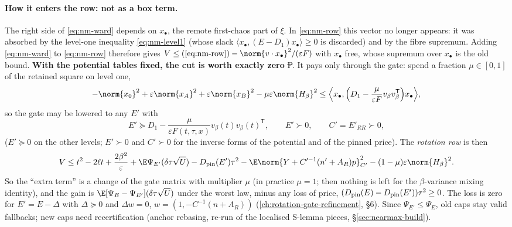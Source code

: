 \paragraph{How it enters the row: not as a box term.} The right side of \eqref{eq:nm-ward} depends on $x_\bullet$, the remote first-chaos part of $\xi$. In \eqref{eq:nm-row} this
vector no longer appears: it was absorbed by the level-one inequality \eqref{eq:nm-level1} (whose slack $\langle x_\bullet,(E-D_1)x_\bullet\rangle\ge0$ is discarded) and by the fibre
supremum. Adding \eqref{eq:nm-ward} to \eqref{eq:nm-row} therefore gives $V\le(\ref{eq:nm-row})-\norm{v\cdot x_\bullet}^2/(\varepsilon F)$ with $x_\bullet$ free, whose supremum over
$x_\bullet$ is the old bound. \textbf{With the potential tables fixed, the cut is worth exactly zero} \st{P}. It pays only through the gate: spend a fraction $\mu\in[0,1]$ of the retained
square on level one,
\[
-\norm{x_0}^2+\varepsilon\norm{x_A}^2+\varepsilon\norm{x_B}^2-\mu\varepsilon\norm{H_\beta}^2\le\Bigl\langle x_\bullet,\Bigl(D_1-\frac{\mu}{\varepsilon F}v_\beta v_\beta^{\mathsf T}\Bigr)x_\bullet\Bigr\rangle ,
\]
so the gate may be lowered to any $E'$ with
\begin{equation}\label{eq:nm-gate}
E'\succeq D_1-\frac{\mu}{\varepsilon F(t,\tau,x)}v_\beta(t)v_\beta(t)^{\mathsf T},\qquad E'\succ0,\qquad C'=E'_{RR}\succ0 ,
\end{equation}
($E'\succeq0$ on the other levels; $E'\succ0$ and $C'\succ0$ for the inverse forms of the potential and of the pinned price). The \emph{rotation row} is then
\begin{equation}\label{eq:nm-rotrow}
V\le t^2-2\ell t+\frac{2\beta^2}\varepsilon+\E\Psi_{E'}(\delta\tau\sqrt U)-D_{\rm pin}(E')\tau^2-\E\norm{Y+C'^{-1}(n'+A_R)p}^2_{C'}-(1-\mu)\varepsilon\norm{H_\beta}^2 .
\end{equation}
So the ``extra term'' is a change of the gate matrix with multiplier $\mu$ (in practice $\mu=1$; then nothing is left for the $\beta$-variance mixing identity), and the gain is
$\E[\Psi_E-\Psi_{E'}](\delta\tau\sqrt U)$ under the worst law, minus any loss of price, $(D_{\rm pin}(E)-D_{\rm pin}(E'))\tau^2\ge0$. The loss is zero for $E'=E-\Delta$ with
$\Delta\succeq0$ and $\Delta w=0$, $w=(1,-C^{-1}(n+A_R))$ (\autoref{ch:rotation-gate-refinement}, \S6). Since $\Psi_{E'}\le\Psi_E$, old caps stay valid fallbacks; new caps need
recertification (anchor rebasing, re-run of the localised S-lemma pieces, \S\ref{sec:nearmax-build}).

